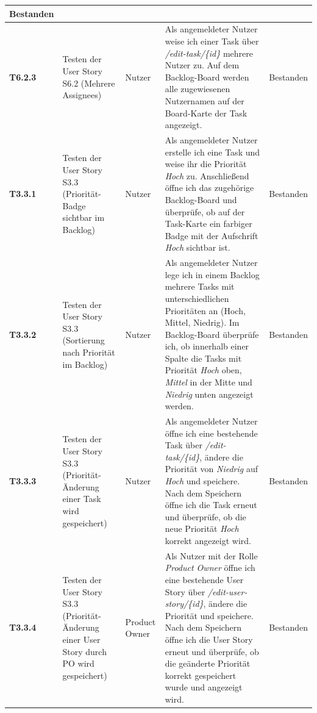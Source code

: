 \documentclass[a4paper,11pt]{article}
\begin{document}
\begin{longtable}{|p{3.3cm}|p{3.3cm}|p{3.3cm}|p{5.5cm}|p{3.3cm}|}
	Bestanden
	\\
	\hline
	\textbf{T6.2.3} &
	Testen der User Story S6.2 (Mehrere Assignees) &
	Nutzer &
	Als angemeldeter Nutzer weise ich einer Task über \textit{/edit-task/\{id\}} mehrere Nutzer zu. Auf dem Backlog-Board werden alle zugewiesenen Nutzernamen auf der Board-Karte der Task angezeigt. &
	Bestanden
	\\
	\hline
	\textbf{T3.3.1} &
	Testen der User Story S3.3 (Priorität-Badge sichtbar im Backlog) &
	Nutzer &
	Als angemeldeter Nutzer erstelle ich eine Task und weise ihr die Priorität \textit{Hoch} zu. Anschließend öffne ich das zugehörige Backlog-Board und überprüfe, ob auf der Task-Karte ein farbiger Badge mit der Aufschrift \textit{Hoch} sichtbar ist. &
	Bestanden
	\\
	\hline
	\textbf{T3.3.2} &
	Testen der User Story S3.3 (Sortierung nach Priorität im Backlog) &
	Nutzer &
	Als angemeldeter Nutzer lege ich in einem Backlog mehrere Tasks mit unterschiedlichen Prioritäten an (Hoch, Mittel, Niedrig). Im Backlog-Board überprüfe ich, ob innerhalb einer Spalte die Tasks mit Priorität \textit{Hoch} oben, \textit{Mittel} in der Mitte und \textit{Niedrig} unten angezeigt werden. &
	Bestanden
	\\
	\hline
	\textbf{T3.3.3} &
	Testen der User Story S3.3 (Priorität-Änderung einer Task wird gespeichert) &
	Nutzer &
	Als angemeldeter Nutzer öffne ich eine bestehende Task über \textit{/edit-task/\{id\}}, ändere die Priorität von \textit{Niedrig} auf \textit{Hoch} und speichere. Nach dem Speichern öffne ich die Task erneut und überprüfe, ob die neue Priorität \textit{Hoch} korrekt angezeigt wird. &
	Bestanden
	\\
	\hline
	\textbf{T3.3.4} &
	Testen der User Story S3.3 (Priorität-Änderung einer User Story durch PO wird gespeichert) &
	Product Owner &
	Als Nutzer mit der Rolle \textit{Product Owner} öffne ich eine bestehende User Story über \textit{/edit-user-story/\{id\}}, ändere die Priorität und speichere. Nach dem Speichern öffne ich die User Story erneut und überprüfe, ob die geänderte Priorität korrekt gespeichert wurde und angezeigt wird. &
	Bestanden
\end{longtable}
\end{document}
